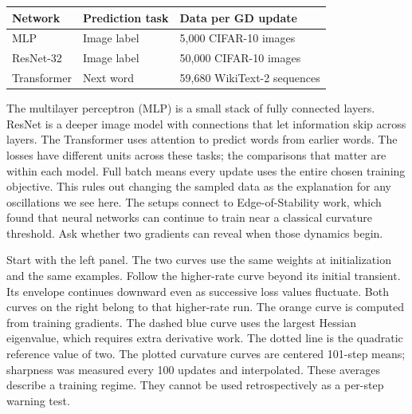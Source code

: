 {\begin{center}\renewcommand{\arraystretch}{1.3}
\begin{tabular}{@{}lll@{}}\toprule
Network & Prediction task & Data per GD update\\\midrule
MLP & Image label & 5,000 CIFAR-10 images\\
ResNet-32 & Image label & 50,000 CIFAR-10 images\\
Transformer & Next word & 59,680 WikiText-2 sequences\\\bottomrule
\end{tabular}\end{center}
\vspace{2mm}}
{The multilayer perceptron (MLP) is a small stack of fully connected layers. ResNet is a deeper image model with connections that let information skip across layers. The Transformer uses attention to predict words from earlier words. The losses have different units across these tasks; the comparisons that matter are within each model. Full batch means every update uses the entire chosen training objective. This rules out changing the sampled data as the explanation for any oscillations we see here. The setups connect to Edge-of-Stability work, which found that neural networks can continue to train near a classical curvature threshold. Ask whether two gradients can reveal when those dynamics begin.}

{
}
{Start with the left panel. The two curves use the same weights at initialization and the same examples. Follow the higher-rate curve beyond its initial transient. Its envelope continues downward even as successive loss values fluctuate. Both curves on the right belong to that higher-rate run. The orange curve is computed from training gradients. The dashed blue curve uses the largest Hessian eigenvalue, which requires extra derivative work. The dotted line is the quadratic reference value of two. The plotted curvature curves are centered 101-step means; sharpness was measured every 100 updates and interpolated. These averages describe a training regime. They cannot be used retrospectively as a per-step warning test.}

